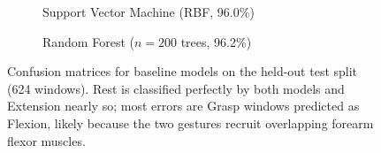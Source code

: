 \documentclass[11pt,a4paper]{article}
\begin{document}
\begin{figure}[htbp]
\centering
\begin{subfigure}[t]{0.48\textwidth}
\centering
{}
\vspace{0.3em}
\caption{Support Vector Machine (RBF, 96.0\%)}
\label{fig:cm_svm}
\end{subfigure}
\hfill
\begin{subfigure}[t]{0.48\textwidth}
\centering
{}
\vspace{0.3em}
\caption{Random Forest ($n=200$ trees, 96.2\%)}
\label{fig:cm_rf}
\end{subfigure}
\caption{Confusion matrices for baseline models on the held-out test split (624 windows). Rest is classified perfectly by both models and Extension nearly so; most errors are Grasp windows predicted as Flexion, likely because the two gestures recruit overlapping forearm flexor muscles.}
\label{fig:confusion_matrices}
\end{figure}
\end{document}
